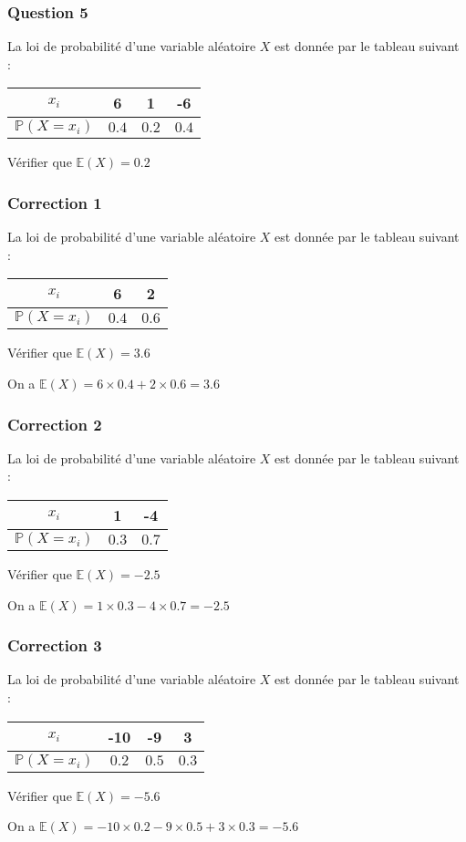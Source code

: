 \documentclass[15pt, mathserif]{beamer}
\newcommand{\Prem}{\mathbb{P}}	%
\begin{document}
\begin{frame} 
	\frametitle{Question 5}
La loi de probabilité d'une variable aléatoire $X$ est donnée par le tableau suivant : 
 \begin{center} 
 \begin{tabular}{|c|c|c|c|} 
 \hline 
 $x_i$ & 6 & 1  & -6 \\ 
 \hline $\Prem(X=x_i)$ & $0.4$ & $0.2$ & $0.4$ \\ 
 \hline 
 \end{tabular} 
 \end{center} 
 Vérifier que $\mathbb{E}(X)=0.2$\end{frame}


\begin{frame}
\vspace{-10mm}
	\frametitle{Correction 1}
La loi de probabilité d'une variable aléatoire $X$ est donnée par le tableau suivant : 
 \begin{center} 
 \begin{tabular}{|c|c|c|} 
 \hline 
 $x_i$ & 6 & 2 \\ 
 \hline $\Prem(X=x_i)$ & $0.4$ & $0.6$ \\ 
 \hline 
 \end{tabular} 
 \end{center} 
 Vérifier que $\mathbb{E}(X)=3.6$ 
 
 On a $\mathbb{E}(X)=6\times 0.4+2 \times 0.6=3.6$\end{frame}


\begin{frame}
\vspace{-10mm}
	\frametitle{Correction 2}
La loi de probabilité d'une variable aléatoire $X$ est donnée par le tableau suivant : 
 \begin{center} 
 \begin{tabular}{|c|c|c|} 
 \hline 
 $x_i$ & 1 & -4 \\ 
 \hline $\Prem(X=x_i)$ & $0.3$ & $0.7$ \\ 
 \hline 
 \end{tabular} 
 \end{center} 
 Vérifier que $\mathbb{E}(X)=-2.5$ 
 
 On a $\mathbb{E}(X)=1\times 0.3-4 \times 0.7=-2.5$\end{frame}


\begin{frame}
\vspace{-10mm}
	\frametitle{Correction 3}
La loi de probabilité d'une variable aléatoire $X$ est donnée par le tableau suivant : 
 \begin{center} 
 \begin{tabular}{|c|c|c|c|} 
 \hline 
 $x_i$ & -10 & -9 & 3 \\ 
 \hline $\Prem(X=x_i)$ & $0.2$ & $0.5$& $0.3$ \\ 
 \hline 
 \end{tabular} 
 \end{center} 
 Vérifier que $\mathbb{E}(X)=-5.6$ 
 
 On a $\mathbb{E}(X)=-10\times 0.2-9 \times 0.5+3 \times 0.3=-5.6$\end{frame}
\end{document}

